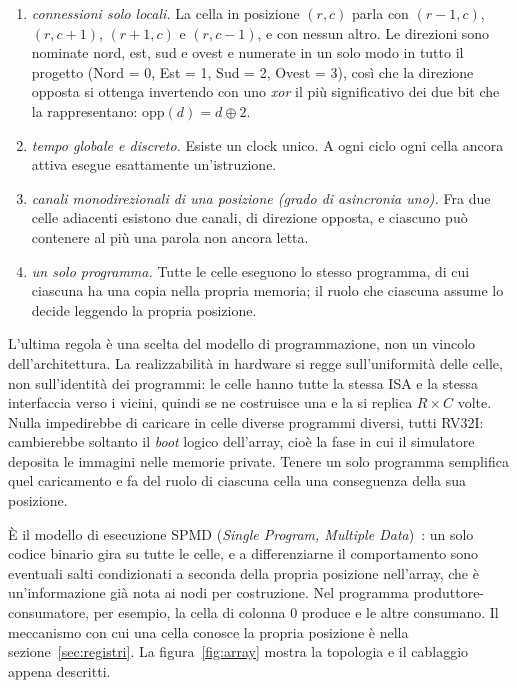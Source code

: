 \begin{enumerate}
    \item \emph{connessioni solo locali.} La cella in posizione $(r,c)$ parla
          con $(r-1,c)$, $(r,c+1)$, $(r+1,c)$ e $(r,c-1)$, e con nessun altro.
          Le direzioni sono nominate nord, est, sud e ovest e numerate in un
          solo modo in tutto il progetto (Nord = 0, Est = 1, Sud = 2, Ovest = 3), 
          così che la direzione opposta si ottenga invertendo con uno \emph{xor}
          il più significativo dei due bit che la rappresentano:
          $\mathrm{opp}(d) = d \oplus 2$.
    \item \emph{tempo globale e discreto.} Esiste un clock unico. A ogni ciclo
          ogni cella ancora attiva esegue esattamente un'istruzione.
    \item \emph{canali monodirezionali di una posizione (grado di asincronia
          uno).} Fra due celle
          adiacenti esistono due canali, di direzione opposta, e ciascuno può contenere
          al più una parola non ancora letta.
        \item \emph{un solo programma.} Tutte le celle eseguono lo stesso programma,
          di cui ciascuna ha una copia nella propria memoria; il ruolo che
          ciascuna assume lo decide leggendo la propria posizione.

\end{enumerate}

L'ultima regola è una scelta del modello di programmazione, non un vincolo
dell'architettura. La realizzabilità in hardware si regge sull'uniformità
delle celle, non sull'identità dei programmi: le celle hanno tutte la stessa
ISA e la stessa interfaccia verso i vicini, quindi se ne costruisce una e la
si replica $R \times C$ volte. Nulla impedirebbe di caricare in celle diverse
programmi diversi, tutti RV32I: cambierebbe soltanto il \emph{boot} logico
dell'array, cioè la fase in cui il simulatore deposita le immagini nelle
memorie private. Tenere un solo programma semplifica quel caricamento e fa
del ruolo di ciascuna cella una conseguenza della sua posizione.

È il modello di esecuzione SPMD (\emph{Single Program, Multiple
Data})~\cite{Darema}: un solo codice binario gira su tutte le celle, e a differenziarne
il comportamento sono eventuali salti condizionati a seconda della propria posizione
nell'array, che è un'informazione già nota ai nodi per costruzione. 
Nel programma produttore-consumatore, per esempio, la cella di colonna 0
produce e le altre consumano. Il meccanismo con cui una cella conosce la
propria posizione è nella sezione~\ref{sec:registri}. La
figura~\ref{fig:array} mostra la topologia e il cablaggio appena descritti.



